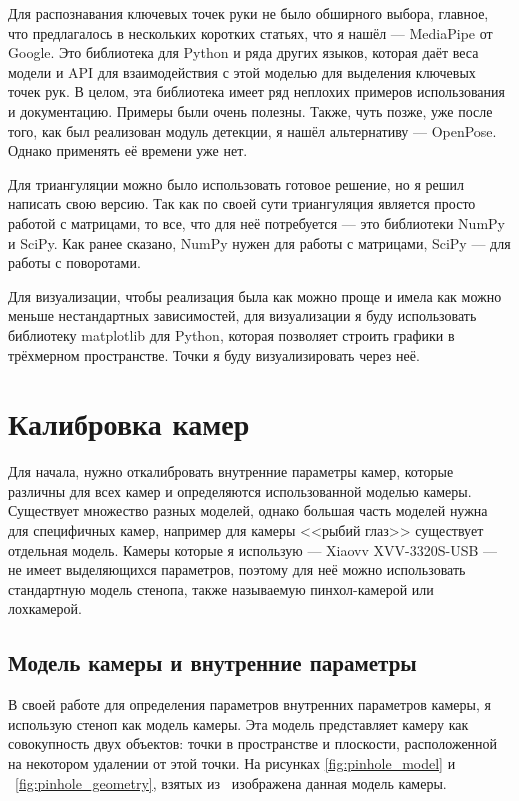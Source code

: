 \documentclass[14pt, a4paper]{extarticle}
\begin{document}
Для распознавания ключевых точек руки не было обширного выбора, главное, что
предлагалось в нескольких коротких статьях, что я нашёл --- MediaPipe от
Google\cite{mediapipe_paper}. Это библиотека для Python и ряда других языков,
которая даёт веса модели и API для взаимодействия с этой моделью для выделения
ключевых точек рук. В целом, эта библиотека имеет ряд неплохих примеров
использования и документацию. Примеры были очень полезны.
Также, чуть позже, уже после того, как был реализован модуль детекции, я нашёл
альтернативу --- OpenPose. Однако применять её времени уже нет.

Для триангуляции можно было использовать готовое решение, но я решил написать
свою версию. Так как по своей сути триангуляция является просто работой с
матрицами, то все, что для неё потребуется --- это библиотеки NumPy и SciPy.
Как ранее сказано, NumPy нужен для работы с матрицами, SciPy --- для работы с
поворотами.

Для визуализации, чтобы реализация была как можно проще и имела как можно
меньше нестандартных зависимостей, для визуализации я буду использовать
библиотеку matplotlib для Python, которая позволяет строить графики в
трёхмерном пространстве. Точки я буду визуализировать через неё.

\section{Калибровка камер}
Для начала, нужно откалибровать внутренние параметры камер, которые различны
для всех камер и определяются использованной моделью камеры. Существует
множество разных моделей, однако большая часть моделей нужна для специфичных
камер, например для камеры <<рыбий глаз>> существует отдельная модель. Камеры
которые я использую --- Xiaovv XVV-3320S-USB --- не имеет выделяющихся
параметров\cite{camera-market}, поэтому для неё можно использовать стандартную
модель стенопа, также называемую пинхол-камерой или лохкамерой.

\subsection{Модель камеры и внутренние параметры}
\label{sec:camera_model} 
В своей работе для определения параметров внутренних
параметров камеры, я использую стеноп как модель камеры. Эта модель
представляет камеру как совокупность двух объектов: точки в пространстве и
плоскости, расположенной на некотором удалении от этой точки. На рисунках
\ref{fig:pinhole_model} и
~\ref{fig:pinhole_geometry}, взятых из~\cite{multiview_cv} изображена данная
модель камеры.
\end{document}
